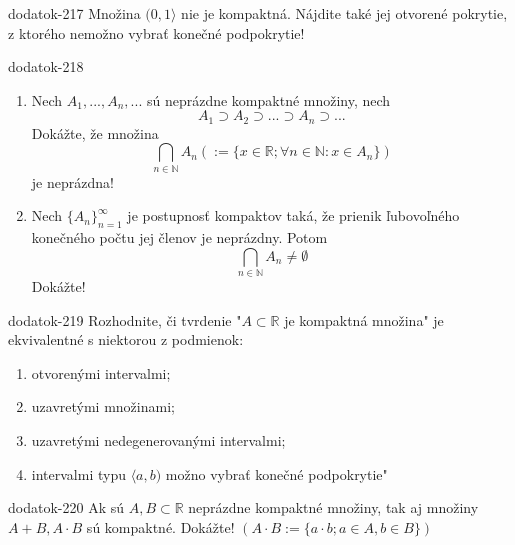 \begin{defproblem}{dodatok-217}
Množina $(0,1 \rangle$ nie je kompaktná. Nájdite také jej otvorené pokrytie, z ktorého nemožno vybrať konečné podpokrytie!
\end{defproblem}

\begin{defproblem}{dodatok-218}
\begin{enumerate}
\item Nech $A_1,...,A_n,...$ sú neprázdne kompaktné množiny, nech
      $$A_1 \supset A_2 \supset ... \supset A_n \supset ...$$
      Dokážte, že množina
      $$\bigcap_{n \in \mathbb{N}} A_n (:=\{x \in \mathbb{R}; \forall n \in \mathbb{N}: x \in A_n\})$$
      je neprázdna!
\item Nech ${\{A_n\}}_{n=1}^\infty$ je postupnosť kompaktov taká, že prienik
      ľubovoľného konečného počtu jej členov je neprázdny. Potom
      $$\bigcap_{n \in \mathbb{N}} A_n \neq \emptyset$$
      Dokážte!
\end{enumerate}
\end{defproblem}

\begin{defproblem}{dodatok-219}
Rozhodnite, či tvrdenie "$A \subset \mathbb{R}$ je kompaktná množina" je ekvivalentné s niektorou z podmienok:
\begin{enumerate}
\item otvorenými intervalmi;
\item uzavretými množinami;
\item uzavretými nedegenerovanými intervalmi;
\item intervalmi typu $\langle a,b)$
možno vybrať konečné podpokrytie"
\end{enumerate}
\end{defproblem}

\begin{defproblem}{dodatok-220}
Ak sú $A,B \subset \mathbb{R}$ neprázdne kompaktné množiny, tak aj množiny $A+B,A \cdot B$ sú kompaktné. Dokážte! $(A \cdot B :=\{a \cdot b; a \in A, b \in B\})$
\end{defproblem}
